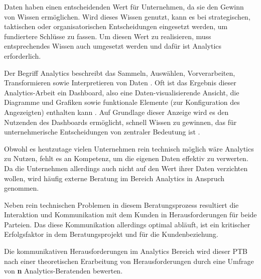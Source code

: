 \documentclass[../main.tex]{subfiles}
\begin{document}
Daten haben einen entscheidenden Wert für Unternehmen, da sie den Gewinn von Wissen ermöglichen.
Wird dieses Wissen genutzt, kann es bei strategischen, taktischen oder organisatorischen Entscheidungen eingesetzt werden, um fundiertere Schlüsse zu fassen.
Um diesen Wert zu realisieren, muss entsprechendes Wissen auch umgesetzt werden und dafür ist Analytics erforderlich.
\autocite{monino2021data, gupta2020digital, sarikaya2018we}

Der Begriff Analytics beschreibt das Sammeln, Auswählen, Vorverarbeiten, Transformieren sowie Interpretieren von Daten \autocite{tsai2015big}.
Oft ist das Ergebnis dieser Analytics-Arbeit ein Dashboard, also eine Daten-visualisierende Ansicht, die Diagramme und Grafiken sowie funktionale Elemente (zur Konfiguration des Angezeigten) enthalten kann \autocite{sarikaya2018we}.
Auf Grundlage dieser Anzeige wird es den Nutzenden des Dashboards ermöglicht, schnell Wissen zu gewinnen, das für unternehmerische Entscheidungen von zentraler Bedeutung ist \autocite{sarikaya2018we}.

Obwohl es heutzutage vielen Unternehmen rein technisch möglich wäre Analytics zu Nutzen, fehlt es an Kompetenz, um die eigenen Daten effektiv zu verwerten.
Da die Unternehmen allerdings auch nicht auf den Wert ihrer Daten verzichten wollen, wird häufig externe Beratung im Bereich Analytics in Anspruch genommen.
\autocite{gupta2020achieving}

Neben rein technischen Problemen in diesem Beratungsprozess resultiert die Interaktion und Kommunikation mit dem Kunden in Herausforderungen für beide Parteien.
Das diese Kommunikation allerdings optimal abläuft, ist ein kritischer Erfolgsfaktor in dem Beratungsprojekt und für die Kundenbeziehung.
\autocite{appelbaum2005critical}

Die kommunikativen Herausforderungen im Analytics Bereich wird dieser PTB nach einer theoretischen Erarbeitung von Herausforderungen durch eine Umfrage von {\color{red}\textbf{n}} Analytics-Beratenden bewerten.
\end{document}
